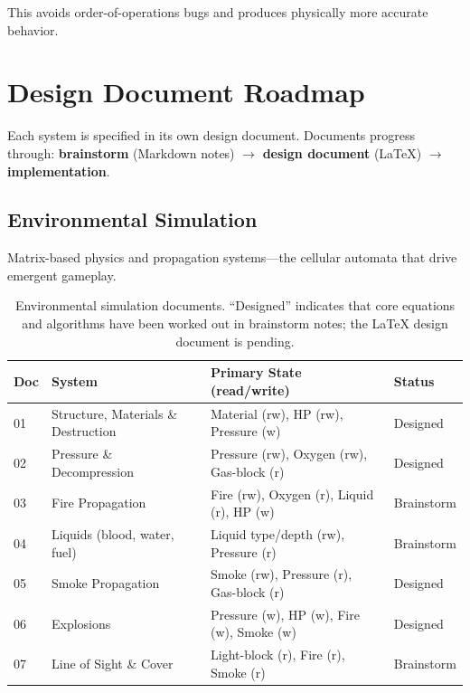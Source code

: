 \documentclass[11pt,a4paper]{article}
\begin{document}
This avoids order-of-operations bugs and produces physically more
accurate behavior.

\section{Design Document Roadmap}
\label{sec:roadmap}

Each system is specified in its own design document.  Documents progress
through: \textbf{brainstorm} (Markdown notes) $\rightarrow$
\textbf{design document} (\LaTeX) $\rightarrow$ \textbf{implementation}.

\subsection{Environmental Simulation}

Matrix-based physics and propagation systems---the cellular automata
that drive emergent gameplay.

\begin{table}[h]
\centering
\begin{tabular}{@{}llp{5.5cm}l@{}}
\toprule
\textbf{Doc} & \textbf{System} & \textbf{Primary State (read/write)} & \textbf{Status} \\
\midrule
01 & Structure, Materials \& Destruction & Material (rw), HP (rw), Pressure (w) & Designed \\
02 & Pressure \& Decompression & Pressure (rw), Oxygen (rw), Gas-block (r) & Designed \\
03 & Fire Propagation & Fire (rw), Oxygen (r), Liquid (r), HP (w) & Brainstorm \\
04 & Liquids (blood, water, fuel) & Liquid type/depth (rw), Pressure (r) & Brainstorm \\
05 & Smoke Propagation & Smoke (rw), Pressure (r), Gas-block (r) & Designed \\
06 & Explosions & Pressure (w), HP (w), Fire (w), Smoke (w) & Designed \\
07 & Line of Sight \& Cover & Light-block (r), Fire (r), Smoke (r) & Brainstorm \\
\bottomrule
\end{tabular}
\caption{Environmental simulation documents.  ``Designed'' indicates
that core equations and algorithms have been worked out in brainstorm
notes; the \LaTeX{} design document is pending.}
\label{tab:env-systems}
\end{table}
\end{document}
